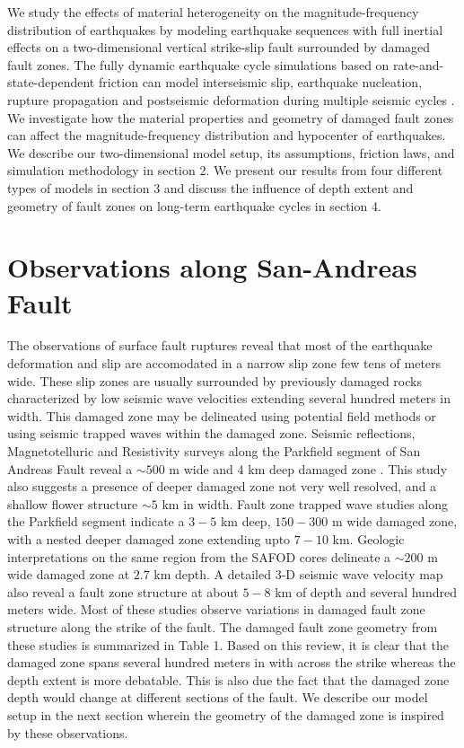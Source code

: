 \documentclass[11pt]{article}
\newcommand{\yihe}[1]{{\color{red}#1}}
\begin{document}
We study the effects of material heterogeneity on the magnitude-frequency distribution of earthquakes by modeling earthquake sequences with full inertial effects on a two-dimensional \yihe{vertical} strike-slip fault surrounded by damaged fault zones. The fully dynamic earthquake cycle simulations based on rate-and-state-dependent friction can model interseismic slip, earthquake nucleation, rupture propagation and postseismic deformation during multiple seismic cycles \citep{lapusta_2000, kaneko_2011, barbot_2012, jiang_lapusta_2016}. We investigate how the material properties and geometry of damaged fault zones can affect the magnitude-frequency distribution and hypocenter of earthquakes. We describe our two-dimensional model setup, its assumptions, friction laws, and simulation methodology in section 2. We present our results from four different types of models in section 3 and discuss the influence of depth extent and geometry of \yihe{fault zones on long-term earthquake cycles in section 4.}


\section{Observations along San-Andreas Fault}
The observations of surface fault ruptures reveal that most of the earthquake deformation and slip are accomodated in a narrow slip zone few tens of meters wide. These slip zones are usually surrounded by previously damaged rocks characterized by low seismic wave velocities extending several hundred meters in width. This damaged zone may be delineated using potential field methods or using seismic trapped waves within the damaged zone. Seismic reflections, Magnetotelluric and Resistivity surveys along the Parkfield segment of San Andreas Fault reveal a $\sim 500$ m wide and $4$ km deep damaged zone \citep{unsworth_1997}. This study also suggests a presence of deeper damaged zone not very well resolved, and a shallow flower structure $\sim 5$ km in width. Fault zone trapped wave studies \citep{lewis_2010} along the Parkfield segment indicate a $3-5$ km deep, $150-300$ m wide damaged zone, with a nested deeper damaged zone extending upto $7-10$ km. Geologic interpretations on the same region from the SAFOD cores \citep{lockner_2011} delineate a $\sim 200$ m wide damaged zone at $2.7$ km depth. A detailed 3-D seismic wave velocity map \citep{thurber_2003} also reveal a fault zone structure at about $5-8$ km of depth and several hundred meters wide. Most of these studies observe variations in damaged fault zone structure along the strike of the fault. The damaged fault zone geometry from these studies is summarized in Table 1. Based on this review, it is clear that the damaged zone spans several hundred meters in with across the strike whereas the depth extent is more debatable. This is also due the fact that the damaged zone depth would change at different sections of the fault. We describe our model setup in the next section wherein the geometry of the damaged zone is inspired by these observations. 
\end{document}
